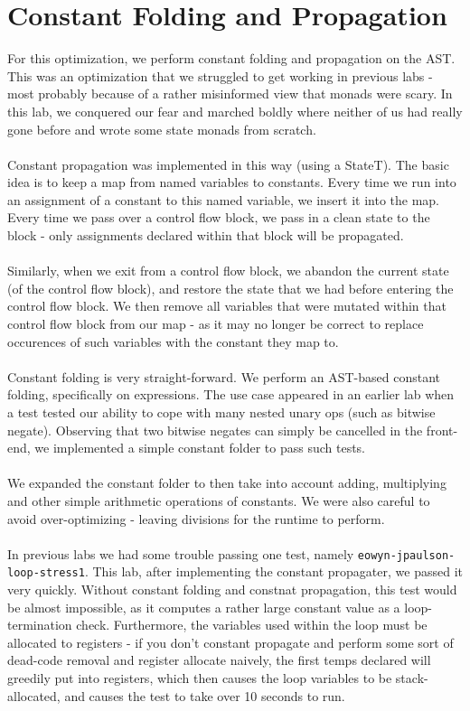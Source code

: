 \documentclass[11pt]{article}
\begin{document}
\section{Constant Folding and Propagation}
For this optimization, we perform constant folding and propagation on the AST. This
was an optimization that we struggled to get working in previous labs - most probably because
of a rather misinformed view that monads were scary. In this lab, we conquered our fear 
and marched boldly where neither of us had really gone before and wrote some state monads from scratch. \\
\\
Constant propagation was implemented in this way (using a StateT). The basic idea is to 
keep a map from named variables to constants. Every time we run into an assignment of a constant 
to this named variable, we insert it into the map. Every time we pass over a control flow block, we pass
in a clean state to the block - only assignments declared within that block will be propagated. \\
\\
Similarly, when we exit from a control flow block, we abandon the current state (of the control
flow block), and restore the state that we had before entering the control flow block. 
We then remove all variables that were mutated within that 
control flow block from our map - as it may no longer be correct to replace occurences of such 
variables with the constant they map to. \\
\\
Constant folding is very straight-forward. We perform an AST-based constant folding, specifically
on expressions. The use case appeared in an earlier lab when a test tested our ability to cope with
many nested unary ops (such as bitwise negate). Observing that two bitwise negates can simply be
cancelled in the front-end, we implemented a simple constant folder to pass such tests. \\
\\
We expanded the constant folder to then take into account adding, multiplying and other simple
arithmetic operations of constants. We were also careful to avoid over-optimizing - leaving
divisions for the runtime to perform.\\
\\
In previous labs we had some trouble passing one test, namely \verb+eowyn-jpaulson-loop-stress1+.
This lab, after implementing the constant propagater, we passed it very quickly. Without
constant folding and constnat propagation, this test would be almost impossible, as it computes
a rather large constant value as a loop-termination check. Furthermore, the variables used
within the loop must be allocated to registers - if you don't constant propagate and perform
some sort of dead-code removal and register allocate naively, the first temps declared will
greedily put into registers, which then causes the loop variables to be stack-allocated,
and causes the test to take over 10 seconds to run.
\end{document}
